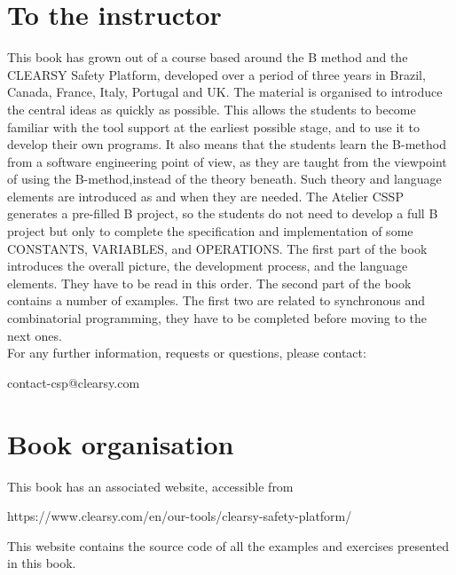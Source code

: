 \section{To the instructor}
This book has grown out of a course based around the B method and the CLEARSY Safety Platform, developed over a period of three years in Brazil, Canada, France, Italy, Portugal and UK.
The material is organised to introduce the central ideas as quickly as possible. This allows the students to become familiar with the tool support at the earliest possible stage, and to use it to develop their own programs. It also means that the students learn the B-method from a software engineering point of view, as they are taught from the viewpoint of using the B-method,instead of the theory beneath. Such theory and language elements are introduced as and when they are needed. The Atelier CSSP generates a pre-filled B project, so the students do not need to develop a full B project but only to complete the specification and implementation of some CONSTANTS, VARIABLES, and OPERATIONS.
The first part of the book introduces the overall picture, the development process, and the language elements. They have to be read in this order.
The second part of the book contains a number of examples. The first two are related to synchronous and combinatorial programming, they have to be completed before moving to the next ones. \\

\noindent For any further information, requests or questions, please contact:
\begin{center}
contact-csp@clearsy.com    
\end{center}


\section{Book organisation}

This book has an associated website, accessible from
\begin{center}
https://www.clearsy.com/en/our-tools/clearsy-safety-platform/    
\end{center}

\noindent This website contains the source code of all the examples and exercises presented in this book.

